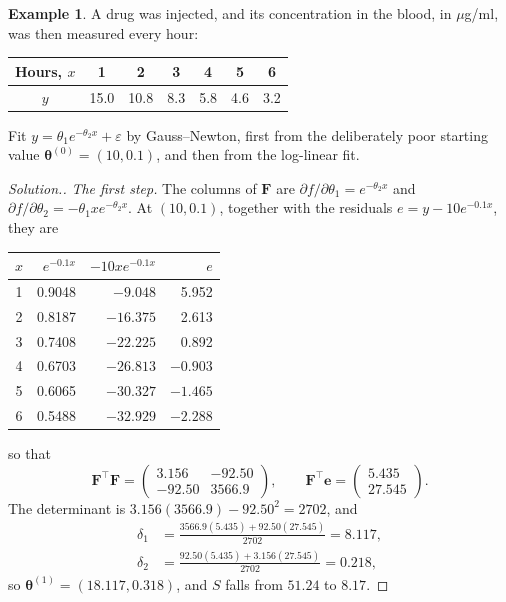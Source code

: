 \documentclass[11pt,a4paper]{article}
\numberwithin{equation}{section}
\theoremstyle{definition}
\newtheorem{exa}[thm]{Example}
\newenvironment{solution}
  {\renewcommand{\qedsymbol}{}\begin{proof}[\textit{Solution}.]}
  {\end{proof}}
\begin{document}
\begin{exa}\label{exa:decay}
A drug was injected, and its concentration in the blood, in $\mu$g/ml, was then measured every hour:
\begin{center}
\begin{tabular}{c|cccccc}
Hours, $x$ & 1 & 2 & 3 & 4 & 5 & 6 \\
\hline
$y$ & 15.0 & 10.8 & 8.3 & 5.8 & 4.6 & 3.2 \\
\end{tabular}
\end{center}
Fit $y = \theta_1e^{-\theta_2x} + \varepsilon$ by Gauss--Newton, first from the deliberately poor starting value $\boldsymbol\theta^{(0)} = (10, 0.1)$, and then
from the log-linear fit.
\end{exa}

\begin{solution}
\emph{The first step.} The columns of $\mathbf{F}$ are $\partial f/\partial\theta_1 = e^{-\theta_2x}$ and $\partial f/\partial\theta_2 = -\theta_1xe^{-\theta_2x}$. At $(10, 0.1)$, together with the residuals $e = y - 10e^{-0.1x}$, they are
\begin{center}
\begin{tabular}{c|rrr}
$x$ & $e^{-0.1x}$ & $-10xe^{-0.1x}$ & $e$ \\
\hline
1 & 0.9048 & $-9.048$ & 5.952 \\
2 & 0.8187 & $-16.375$ & 2.613 \\
3 & 0.7408 & $-22.225$ & 0.892 \\
4 & 0.6703 & $-26.813$ & $-0.903$ \\
5 & 0.6065 & $-30.327$ & $-1.465$ \\
6 & 0.5488 & $-32.929$ & $-2.288$ \\
\end{tabular}
\end{center}
so that
\[
\mathbf{F}^\top\mathbf{F} = \begin{pmatrix} 3.156 & -92.50 \\ -92.50 & 3566.9 \end{pmatrix} , \qquad
\mathbf{F}^\top\mathbf{e} = \begin{pmatrix} 5.435 \\ 27.545 \end{pmatrix} .
\]
The determinant is $3.156(3566.9) - 92.50^2 = 2702$, and
\begin{align*}
\delta_1 &= \frac{3566.9(5.435) + 92.50(27.545)}{2702} = 8.117 , \\
\delta_2 &= \frac{92.50(5.435) + 3.156(27.545)}{2702} = 0.218 ,
\end{align*}
so $\boldsymbol\theta^{(1)} = (18.117, 0.318)$, and $S$ falls from $51.24$ to $8.17$.


\end{solution}
\end{document}
